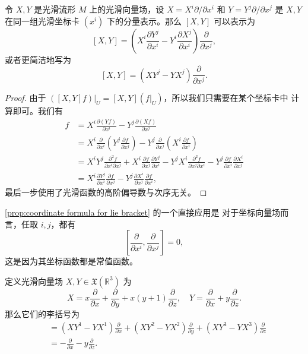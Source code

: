 \documentclass[fontset=none]{Notes}
\begin{document}
\begin{proposition}[李括号的坐标公式]\label{prop:coordinate formula for lie bracket}
  令 $X,Y$ 是光滑流形 $M$ 上的光滑向量场，设 $X=X^i\partial/\partial x^i$
  和 $Y=Y^j\partial /\partial x^j$ 是 $X,Y$ 在同一组光滑坐标卡
  $(x^i)$ 下的分量表示。那么 $[X,Y]$ 可以表示为
  \[
    [X,Y]=\left(X^i\frac{\partial Y^j}{\partial x^i}-Y^i\frac{\partial X^j}{\partial x^i}\right)
    \frac{\partial}{\partial x^j},  
  \]
  或者更简洁地写为
  \[
    [X,Y]=\left(XY^j-YX^j\right)  \frac{\partial}{\partial x^j}.
  \]
\end{proposition}
\begin{proof}
  由于 $([X,Y]f)|_U=[X,Y](f|_U)$，所以我们只需要在某个坐标卡中
  计算即可。我们有
  \begin{align*}
    [X,Y]f&=X^i\frac{\partial (Yf)}{\partial x^i}-Y^j\frac{\partial (Xf)}{\partial x^j}\\
    &=X^i\frac{\partial}{\partial x^i}\left(Y^j\frac{\partial f}{\partial x^j}\right)
    -Y^j\frac{\partial}{\partial x^j}\left(X^i\frac{\partial f}{\partial x^i}\right)\\
    &=X^iY^j\frac{\partial^2f}{\partial x^i\partial x^j}
    +X^i\frac{\partial f}{\partial x^j}\frac{\partial Y^j}{\partial x^i}
    -Y^jX^i\frac{\partial^2 f}{\partial x^j\partial x^i}
    -Y^j\frac{\partial f}{\partial x^i}\frac{\partial X^i}{\partial x^j}\\
    &=X^i\frac{\partial Y^j}{\partial x^i}\frac{\partial f}{\partial x^j}-
    Y^j\frac{\partial X^i}{\partial x^j}\frac{\partial f}{\partial x^i},
  \end{align*}
  最后一步使用了光滑函数的高阶偏导数与次序无关。
\end{proof}

\autoref{prop:coordinate formula for lie bracket} 的一个直接应用是
对于坐标向量场而言，任取 $i,j$，都有
\[
  \left[\frac{\partial}{\partial x^i},\frac{\partial}{\partial x^j}\right]  
  =0,
\]
这是因为其坐标函数都是常值函数。

\begin{example}
  定义光滑向量场 $X,Y\in \mathfrak{X}(\mathbb{R}^3)$ 为
  \[
    X=x\frac{\partial}{\partial x}+\frac{\partial}{\partial y}
    +x(y+1)\frac{\partial }{\partial z},
    \quad 
    Y=\frac{\partial}{\partial x}+y\frac{\partial }{\partial z}.   
  \]
  那么它们的李括号为
  \begin{align*}
    [X,Y]&= \left(XY^1-YX^1\right)\frac{\partial}{\partial x}
    +\left(XY^2-YX^2\right)\frac{\partial}{\partial y}
    +\left(XY^3-YX^3\right)\frac{\partial}{\partial z}\\
    &=-\frac{\partial}{\partial x}-y\frac{\partial}{\partial z}.
  \end{align*}
\end{example}
\end{document}
